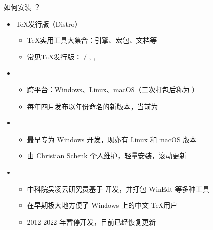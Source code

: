 \begin{frame}{如何安装 ？}
  \begin{itemize}
    \item \TeX{}发行版（Distro）
      \begin{itemize}
        \item \TeX{}实用工具大集合：引擎、宏包、文档等
        \item 常见\TeX{}发行版：
          \alert{\TL{} / \MacTeX}, \CTeX, \MiKTeX
      \end{itemize}
    \item \TL
      \begin{itemize}
        \item 跨平台：Windows、Linux、macOS（二次打包后称为 \MacTeX）
        \item 每年四月发布以年份命名的新版本，当前为 \TL \TLVersion
      \end{itemize}
    \item \MiKTeX
      \begin{itemize}
        \item 最早专为 Windows 开发，现亦有 Linux 和 macOS 版本
        \item 由 Christian Schenk 个人维护，轻量安装，滚动更新
      \end{itemize}
    \item \CTeX
      \begin{itemize}
        \item 中科院吴凌云研究员基于 \MiKTeX 开发，并打包 WinEdt 等多种工具
        \item 在早期极大地方便了 Windows 上的中文 \TeX 用户
        \item 2012-2022 年暂停开发，目前已经恢复更新
      \end{itemize}
  \end{itemize}
\end{frame}

